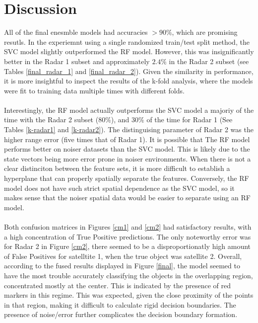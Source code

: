 \documentclass[./report_entry.tex]{subfiles}
\begin{document}
    \section*{Discussion}

        \noindent All of the final enesmble models had accuracies $>90\%$, which are promising resutls.  In the 
        experiemnt using a single randomized train/test split method, the SVC model slightly outperformed the RF model.  
        However, this was insignificantly better in the Radar 1 subset and approximately $2.4\%$ in the Radar 2 subset (see Tables \ref{final_radar_1} and \ref{final_radar_2}).
        Given the similarity in performance, it is more insightful to inspect the results of the k-fold analysis, where
        the models were fit to training data multiple times with different folds.
        \\ \\
        \noindent Interestingly, the RF model actually outperforms the SVC model a majoriy of the time with the Radar 2 subset ($80\%$), and 
        $30\%$ of the time for Radar 1 (See Tables \ref{k-radar1} and \ref{k-radar2}).  The distinguising parameter of Radar 2 was the higher range error (five times that of Radar 1).  It
        is possible that The RF model performs better on noiser datasets than the SVC model.  This is likely due to 
        the state vectors being more error prone in noiser environments.  When there is not a clear distinciton between 
        the feature sets, it is more difficult to establish a hyperplane that can properly spatially separate the features.
        Conversely, the RF model does not have such strict spatial dependence as the SVC model, so it makes sense that the noiser spatial data would
        be easier to separate using an RF model.
        \\ \\
        \noindent Both confusion matrices in Figures \ref{cm1} and \ref{cm2} had satisfactory results, with a high
        concentration of True Positive predictions.  The only noteworthy error was for Radar 2 in Figure \ref{cm2}, there seemed to be a
        disproportionatly high amount of False Positives for satelltite 1, when the true object was satellite 2.  Overall, according to the fused results
        displayed in Figure \ref{final}, the model seemed to have the most trouble accurately classifying the objects 
        in the overlapping region, concentrated mostly at the center.  This is indicated by the presence of red markers in this regime.
        This was expected, given the close proximity of the points in that region, making it difficult to calculate rigid decision boundaries.
        The presence of noise/error further complicates the decision boundary formation.
\end{document}
